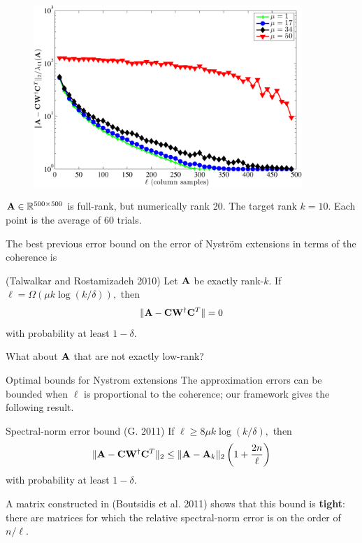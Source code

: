 \documentclass[xcolor=x11names,compress,ignorenonframetext,10pt]{beamer}
\renewcommand{\(}{\begin{columns}}
\renewcommand{\)}{\end{columns}}
\newcommand{\<}[1]{\begin{column}{#1}}
\renewcommand{\>}{\end{column}}
\def\refcolor{DodgerBlue4}
\newcommand{\refer}[1]{({\color{\refcolor}#1})}
\begin{document}
  \begin{frame}
  
 \begin{figure}[h]
 \centering
 \centerline{\includegraphics[width=4in,keepaspectratio=true]{figures/spsd/nystromcoherencedependence}} 
 \end{figure}
 \vspace{-2em}
$\mathbf{A} \in \mathbb{R}^{500 \times 500}$ is full-rank, but numerically rank 20. The target rank $k = 10.$
Each point is the average of 60 trials.

\end{frame}

\begin{frame}
  The best previous error bound on the error of Nystr\"om extensions in terms of the coherence is 
  
  \begin{block}{\refer{Talwalkar and Rostamizadeh 2010}}
   Let $\mathbf{A}$ be exactly rank-$k$. If $\ell = \Omega(\mu k \log(k/\delta)),$ then 
   \[ \|\mathbf{A} - \mathbf{C} \mathbf{W}^\dagger \mathbf{C}^T\| = 0 \]
   with probability at least $1-\delta.$
  \end{block}
 
  What about $\mathbf{A}$ that are not exactly low-rank?
  \end{frame}
  
\begin{frame}{Optimal bounds for Nystrom extensions}
  The approximation errors can be bounded when $\ell$ is proportional to the coherence; our framework
  gives the following result.
  
  \begin{block}{Spectral-norm error bound \refer{G. 2011}}
   If $\ell \geq 8 \mu k \log(k/\delta),$ then
   \[ \|\mathbf{A} - \mathbf{C} \mathbf{W}^\dagger \mathbf{C}^T\|_2 \leq \|\mathbf{A} - \mathbf{A}_k\|_2 \left(1 + \frac{2 n}{\ell} \right)\]
   with probability at least $1 - \delta.$ 
  \end{block}

  A matrix constructed in \refer{Boutsidis et al. 2011} shows that this bound is \textbf{tight}: there are matrices for which the relative
  spectral-norm error is on the order of $n/\ell.$
 \end{frame} 
\end{document}
